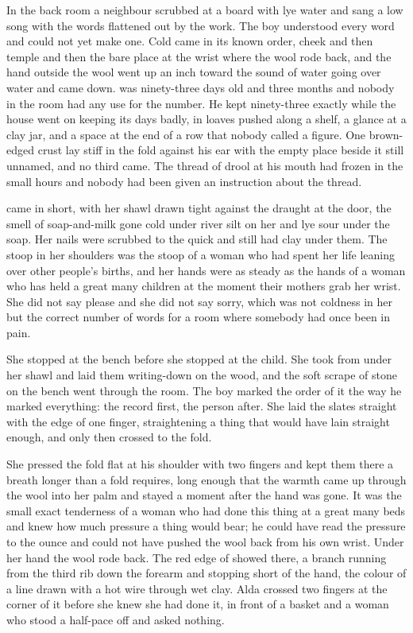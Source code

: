 In the back room a neighbour scrubbed at a board with lye water and sang a low song with the words flattened out by the work. The boy understood every word and could not yet make one. Cold came in its known order, cheek and then temple and then the bare place at the wrist where the wool rode back, and the hand outside the wool went up an inch toward the sound of water going over water and came down.  was ninety-three days old and three months and nobody in the room had any use for the number. He kept ninety-three exactly while the house went on keeping its days badly, in loaves pushed along a shelf, a glance at a clay jar, and a space at the end of a row that nobody called a figure. One brown-edged crust lay stiff in the fold against his ear with the empty place beside it still unnamed, and no third came. The thread of drool at his mouth had frozen in the small hours and nobody had been given an instruction about the thread.

\scenebreak

 came in short, with her shawl drawn tight against the draught at the door, the smell of soap-and-milk gone cold under river silt on her and lye sour under the soap. Her nails were scrubbed to the quick and still had clay under them. The stoop in her shoulders was the stoop of a woman who had spent her life leaning over other people's births, and her hands were as steady as the hands of a woman who has held a great many children at the moment their mothers grab her wrist. She did not say please and she did not say sorry, which was not coldness in her but the correct number of words for a room where somebody had once been in pain.

She stopped at the bench before she stopped at the child. She took  from under her shawl and laid them writing-down on the wood, and the soft scrape of stone on the bench went through the room. The boy marked the order of it the way he marked everything: the record first, the person after. She laid the slates straight with the edge of one finger, straightening a thing that would have lain straight enough, and only then crossed to the fold.

She pressed the fold flat at his shoulder with two fingers and kept them there a breath longer than a fold requires, long enough that the warmth came up through the wool into her palm and stayed a moment after the hand was gone. It was the small exact tenderness of a woman who had done this thing at a great many beds and knew how much pressure a thing would bear; he could have read the pressure to the ounce and could not have pushed the wool back from his own wrist. Under her hand the wool rode back. The red edge of  showed there, a branch running from the third rib down the forearm and stopping short of the hand, the colour of a line drawn with a hot wire through wet clay. Alda crossed two fingers at the corner of it before she knew she had done it, in front of a basket and a woman who stood a half-pace off and asked nothing.

